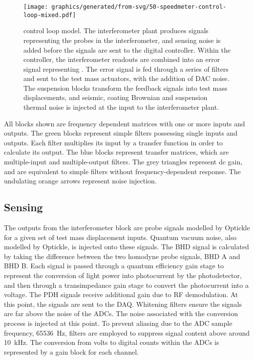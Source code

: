 \begin{figure}
  \texttt{[image: graphics/generated/from-svg/50-speedmeter-control-loop-mixed.pdf]}
  \caption[Modelled \SSMEXPT{} control loop using both displacement and velocity feedback]{\label{fig:ssm-control-loop-mixed}\SSM{} control loop model. The interferometer plant produces signals representing the probes in the interferometer, and sensing noise is added before the signals are sent to the digital controller. Within the controller, the interferometer readouts are combined into an error signal representing \LMINUS{}. The error signal is fed through a series of filters and sent to the test mass actuators, with the addition of DAC noise. The suspension blocks transform the feedback signals into test mass displacements, and seismic, coating Brownian and suspension thermal noise is injected at the input to the interferometer plant.}
\end{figure}

All blocks shown are frequency dependent matrices with one or more inputs and outputs. The green blocks represent simple filters possessing single inputs and outputs. Each filter multiplies its input by a transfer function in order to calculate its output. The blue blocks represent transfer matrices, which are multiple-input and multiple-output filters. The grey triangles represent dc gain, and are equivalent to simple filters without frequency-dependent response. The undulating orange arrows represent noise injection.

\subsection{Sensing}

The outputs from the interferometer block are probe signals modelled by Optickle for a given set of test mass displacement inputs. Quantum vacuum noise, also modelled by Optickle, is injected onto these signals. The BHD signal is calculated by taking the difference between the two homodyne probe signals, BHD A and BHD B. Each signal is passed through a quantum efficiency gain stage to represent the conversion of light power into photocurrent by the photodetector, and then through a transimpedance gain stage to convert the photocurrent into a voltage. The PDH signals receive additional gain due to RF demodulation. At this point, the signals are sent to the DAQ. Whitening filters ensure the signals are far above the noise of the ADCs. The noise associated with the conversion process is injected at this point. To prevent aliasing due to the ADC sample frequency, \SI{65536}{\hertz}, filters are employed to suppress signal content above around \SI{10}{\kilo\hertz}. The conversion from volts to digital counts within the ADCs is represented by a gain block for each channel.


